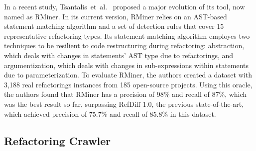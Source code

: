In a recent study, Tsantalis~et~al.~\cite{tsantalis2018rminer} proposed a major evolution of its tool, now named as RMiner.
In its current version, RMiner relies on an AST-based statement matching algorithm and a set of detection rules that cover 15 representative refactoring types. 
Its statement matching algorithm employes two techniques to be resilient to code restructuring during refactoring: abstraction, which deals with changes in statements’ AST type due to refactorings, and argumentization, which deals with changes in sub-expressions within statements due to parameterization.
To evaluate RMiner, the authors created a dataset with 3,188 real refactorings instances from 185 open-source projects. Using this oracle, the authors found that RMiner has a precision of 98\% and recall of 87\%, which was the best result so far, surpassing RefDiff 1.0, the previous state-of-the-art, which achieved precision of 75.7\% and recall of 85.8\% in this dataset.






\subsection{Refactoring Crawler}

